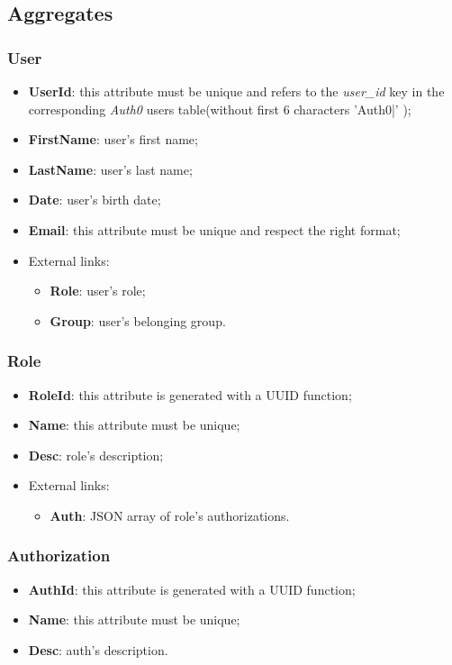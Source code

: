 \newpage
{}
\subsection{Aggregates}
\subsubsection{User}
\begin{itemize}
	\item \textbf{UserId}: this attribute must be unique and refers to the \emph{user\_id} key in the corresponding \emph{Auth0} users table(without first 6 characters 'Auth0|' );
	\item \textbf{FirstName}: user's first name;
	\item \textbf{LastName}: user's  last name;
	\item \textbf{Date}: user's birth date;
	\item \textbf{Email}: this attribute must be unique and respect the right format;
	\item External links:
	\begin{itemize}
		\item \textbf{Role}: user's role;
		\item \textbf{Group}: user's belonging group.
	\end{itemize}
\end{itemize}

\subsubsection{Role}
\begin{itemize}
	\item \textbf{RoleId}: this attribute is generated with a UUID function;
	\item \textbf{Name}: this attribute must be unique;
	\item \textbf{Desc}: role's description;
	\item External links:
	\begin{itemize}
		\item \textbf{Auth}: JSON array of role's authorizations.
	\end{itemize}
\end{itemize}

\subsubsection{Authorization}
\begin{itemize}
	\item \textbf{AuthId}: this attribute is generated with a UUID function;
	\item \textbf{Name}: this attribute must be unique;
	\item \textbf{Desc}: auth's description.
\end{itemize}


